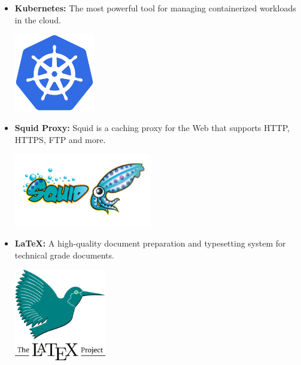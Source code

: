 \begin{itemize}
    \item \textbf{Kubernetes:} \newline The most powerful tool for managing containerized workloads in the cloud. \newline
          \begin{minipage}{\linewidth}
              \centering
              \includegraphics[width=3.5cm]{src/assets/logos/kubernetes_512x512.png}
          \end{minipage}

          \newpage
    \item \textbf{Squid Proxy:} \newline \cite{squid} Squid is a caching proxy for the Web that supports HTTP, HTTPS, FTP and more. \newline
          \begin{minipage}{\linewidth}
              \centering
              \includegraphics[width=6cm]{src/assets/logos/squid-proxy.png}
          \end{minipage}
    \item \textbf{LaTeX:} \newline \cite{latex-project} A high-quality document preparation and typesetting system for technical grade documents. \newline \newline
          \begin{minipage}{\linewidth}
              \centering
              \includegraphics[width=4cm]{src/assets/logos/latex_200x200.png}
          \end{minipage}

          \newpage
\end{itemize}

